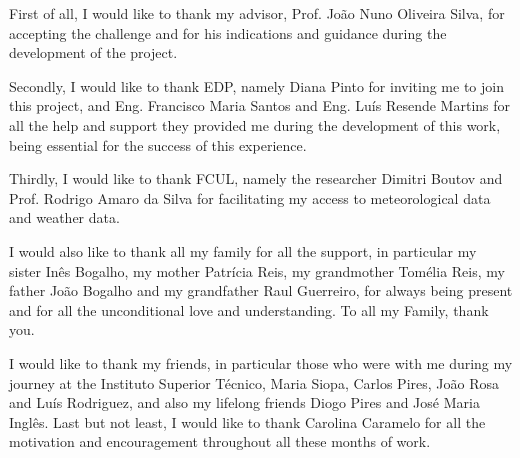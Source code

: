 
First of all, I would like to thank my advisor, Prof. João Nuno Oliveira Silva, for accepting the challenge and for his indications and guidance during the development of the project. 

Secondly, I would like to thank EDP, namely Diana Pinto for inviting me to join this project, and Eng. Francisco Maria Santos and Eng. Luís Resende Martins for all the help and support they provided me during the development of this work, being essential for the success of this experience.

Thirdly, I would like to thank FCUL, namely the researcher Dimitri Boutov and Prof. Rodrigo Amaro da Silva for facilitating my access to meteorological data and weather data.

I would also like to thank all my family for all the support, in particular my sister Inês Bogalho, my mother Patrícia Reis, my grandmother Tomélia Reis, my father João Bogalho and my grandfather Raul Guerreiro, for always being present and for all the unconditional love and understanding. To all my Family, thank you.

I would like to thank my friends, in particular those who were with me during my journey at the Instituto Superior Técnico, Maria Siopa, Carlos Pires, João Rosa and Luís Rodriguez, and also my lifelong friends Diogo Pires and José Maria Inglês. Last but not least, I would like to thank Carolina Caramelo for all the motivation and encouragement throughout all these months of work.